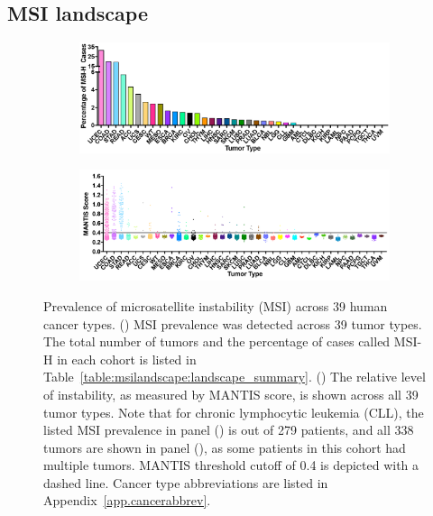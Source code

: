 \subsection{MSI landscape}
\label{ssec:msilandscape:landscape_results}
\begin{figure}[htp]
    \centering
    \begin{subfigure}{0.95\textwidth}
        \includegraphics[width=\linewidth,keepaspectratio]{images/msilandscape/msi_landscape_bars}
        \caption{}\label{fig:msilandscape:msi_landscape_bars}
    \end{subfigure}
    
    \begin{subfigure}{0.95\textwidth}
        \includegraphics[width=\linewidth,keepaspectratio]{images/msilandscape/msi_landscape_dist}
        \caption{}\label{fig:msilandscape:msi_landscape_dist}
    \end{subfigure}
    \caption[Prevalence of MSI across 39 human cancer types.]{Prevalence of microsatellite instability (MSI) across 39 human cancer types. () MSI prevalence was detected across 39 tumor types. The total number of tumors and the percentage of cases called MSI-H in each cohort is listed in Table~\ref{table:msilandscape:landscape_summary}. () The relative level of instability, as measured by MANTIS score, is shown across all 39 tumor types. Note that for chronic lymphocytic leukemia (CLL), the listed MSI prevalence in panel () is out of 279 patients, and all 338 tumors are shown in panel (), as some patients in this cohort had multiple tumors. MANTIS threshold cutoff of 0.4 is depicted with a dashed line. Cancer type abbreviations are listed in Appendix~\ref{app.cancerabbrev}.}
    \label{fig:msilandscape:msi_landscape}
\end{figure}

